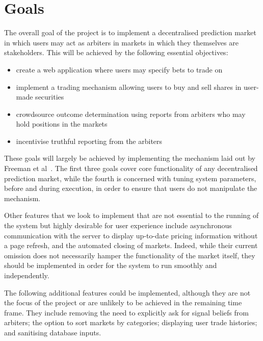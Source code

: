 \section{Goals}

\label{sec:goals}

The overall goal of the project is to implement a decentralised prediction
market in which users may act as arbiters in markets in which they themselves
are stakeholders. This will be achieved by the following essential objectives:

\begin{itemize}
	\itemsep0em
	\item create a web application where users may specify bets to trade on
	\item implement a trading mechanism allowing users to buy and sell
		shares in user-made securities
	\item crowdsource outcome determination using reports from arbiters who may
		hold positions in the markets
	\item incentivise truthful reporting from the arbiters
\end{itemize}

These goals will largely be achieved by implementing the mechanism laid out by
Freeman et al~\cite{CODiPM}. The first three goals cover core functionality of
any decentralised prediction market, while the fourth is concerned with tuning
system parameters, before and during execution, in order to ensure that users
do not manipulate the mechanism.
 
Other features that we look to implement that are not essential to the running
of the system but highly desirable for user experience include asynchronous
communication with the server to display up-to-date pricing information without
a page refresh, and the automated closing of markets.  Indeed, while their
current omission does not necessarily hamper the functionality of the market
itself, they should be implemented in order for the system to run smoothly and
independently.

The following additional features could be implemented, although they are not
the focus of the project or are unlikely to be achieved in the remaining time
frame. They include removing the need to explicitly ask for signal beliefs
from arbiters; the option to sort markets by categories; displaying user trade
histories; and sanitising database inputs.



